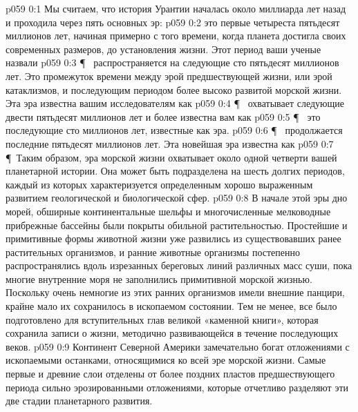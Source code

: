 \vs p059 0:1 Мы считаем, что история Урантии началась около миллиарда лет назад и проходила через пять основных эр:
\vs p059 0:2 \bibnobreakspace {} это первые четыреста пятьдесят миллионов лет, начиная примерно с того времени, когда планета достигла своих современных размеров, до установления жизни. Этот период ваши ученые назвали 
\vs p059 0:3 \P\ \bibnobreakspace {} распространяется на следующие сто пятьдесят миллионов лет. Это промежуток времени между эрой предшествующей жизни, или эрой катаклизмов, и последующим периодом более высоко развитой морской жизни. Эта эра известна вашим исследователям как 
\vs p059 0:4 \P\ \bibnobreakspace {} охватывает следующие двести пятьдесят миллионов лет и более известна вам как 
\vs p059 0:5 \P\ \bibnobreakspace {} это последующие сто миллионов лет, известные как  эра.
\vs p059 0:6 \P\ \bibnobreakspace {} продолжается последние пятьдесят миллионов лет. Эта новейшая эра известна как 
\vs p059 0:7 \P\ Таким образом, эра морской жизни охватывает около одной четверти вашей планетарной истории. Она может быть подразделена на шесть долгих периодов, каждый из которых характеризуется определенным хорошо выраженным развитием геологической и биологической сфер.
\vs p059 0:8 В начале этой эры дно морей, обширные континентальные шельфы и многочисленные мелководные прибрежные бассейны были покрыты обильной растительностью. Простейшие и примитивные формы животной жизни уже развились из существовавших ранее растительных организмов, и ранние животные организмы постепенно распространялись вдоль изрезанных береговых линий различных масс суши, пока многие внутренние моря не заполнились примитивной морской жизнью. Поскольку очень немногие из этих ранних организмов имели внешние панцири, крайне мало их сохранилось в ископаемом состоянии. Тем не менее, все было подготовлено для вступительных глав великой «каменной книги», которая сохранила записи о жизни, методично развивающейся в течение последующих веков.
\vs p059 0:9 Континент Северной Америки замечательно богат отложениями с ископаемыми останками, относящимися ко всей эре морской жизни. Самые первые и древние слои отделены от более поздних пластов предшествующего периода сильно эрозированными отложениями, которые отчетливо разделяют эти две стадии планетарного развития.
